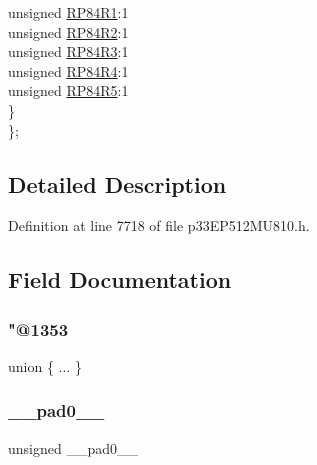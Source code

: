 \begin{DoxyCompactItemize}
\begin{tabbing}
\>\>unsigned \hyperlink{structtag_r_p_o_r5_b_i_t_s_ac40abc57d46cedb24a88361ebb041ff3}{RP84R1}:1\\
\>\>unsigned \hyperlink{structtag_r_p_o_r5_b_i_t_s_af3c943091d5435d0a89224b0ac4fad03}{RP84R2}:1\\
\>\>unsigned \hyperlink{structtag_r_p_o_r5_b_i_t_s_a39cc34fb9710ed039a225ebede2be720}{RP84R3}:1\\
\>\>unsigned \hyperlink{structtag_r_p_o_r5_b_i_t_s_ad1d821508b6656f87679efec862b7fa6}{RP84R4}:1\\
\>\>unsigned \hyperlink{structtag_r_p_o_r5_b_i_t_s_a7f209bbc75114015e80c1398974394f7}{RP84R5}:1\\
\>\} \\
\}; \\

\end{tabbing}\end{DoxyCompactItemize}


\subsection{Detailed Description}


Definition at line 7718 of file p33\+E\+P512\+M\+U810.\+h.



\subsection{Field Documentation}
\mbox{\label{structtag_r_p_o_r5_b_i_t_s_ac79cc0813dccd6bcc12bfd7a1ff0706d}} 
\subsubsection{\texorpdfstring{"@1353}{@1353}}
{\footnotesize\ttfamily union \{ ... \} }

\mbox{\label{structtag_r_p_o_r5_b_i_t_s_adf71f3d8410c1f1dbbc96680a92c49af}} 
\subsubsection{\texorpdfstring{\+\_\+\+\_\+pad0\+\_\+\+\_\+}{\_\_pad0\_\_}}
{\footnotesize\ttfamily unsigned \+\_\+\+\_\+pad0\+\_\+\+\_\+}




